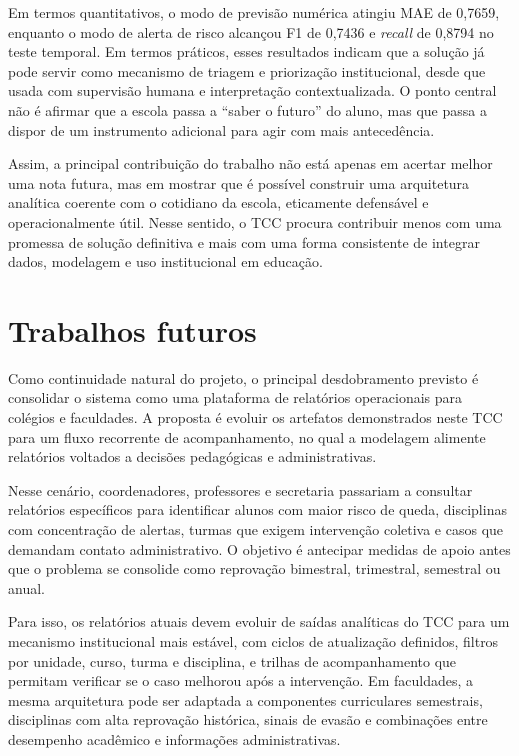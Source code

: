 Em termos quantitativos, o modo de previs\~ao num\'erica atingiu MAE de 0,7659, enquanto o modo de alerta de risco alcan\c{c}ou F1 de 0,7436 e \textit{recall} de 0,8794 no teste temporal. Em termos pr\'aticos, esses resultados indicam que a solu\c{c}\~ao j\'a pode servir como mecanismo de triagem e prioriza\c{c}\~ao institucional, desde que usada com supervis\~ao humana e interpreta\c{c}\~ao contextualizada. O ponto central n\~ao \'e afirmar que a escola passa a ``saber o futuro'' do aluno, mas que passa a dispor de um instrumento adicional para agir com mais anteced\^encia.

Assim, a principal contribui\c{c}\~ao do trabalho n\~ao est\'a apenas em acertar melhor uma nota futura, mas em mostrar que \'e poss\'ivel construir uma arquitetura anal\'itica coerente com o cotidiano da escola, eticamente defens\'avel e operacionalmente \'util. Nesse sentido, o TCC procura contribuir menos com uma promessa de solu\c{c}\~ao definitiva e mais com uma forma consistente de integrar dados, modelagem e uso institucional em educa\c{c}\~ao.

\section{Trabalhos futuros}
\label{sec:futuro}

Como continuidade natural do projeto, o principal desdobramento previsto \'e consolidar o sistema como uma plataforma de relat\'orios operacionais para col\'egios e faculdades. A proposta \'e evoluir os artefatos demonstrados neste TCC para um fluxo recorrente de acompanhamento, no qual a modelagem alimente relat\'orios voltados a decis\~oes pedag\'ogicas e administrativas.

Nesse cen\'ario, coordenadores, professores e secretaria passariam a consultar relat\'orios espec\'ificos para identificar alunos com maior risco de queda, disciplinas com concentra\c{c}\~ao de alertas, turmas que exigem interven\c{c}\~ao coletiva e casos que demandam contato administrativo. O objetivo \'e antecipar medidas de apoio antes que o problema se consolide como reprova\c{c}\~ao bimestral, trimestral, semestral ou anual.

Para isso, os relat\'orios atuais devem evoluir de sa\'idas anal\'iticas do TCC para um mecanismo institucional mais est\'avel, com ciclos de atualiza\c{c}\~ao definidos, filtros por unidade, curso, turma e disciplina, e trilhas de acompanhamento que permitam verificar se o caso melhorou ap\'os a interven\c{c}\~ao. Em faculdades, a mesma arquitetura pode ser adaptada a componentes curriculares semestrais, disciplinas com alta reprova\c{c}\~ao hist\'orica, sinais de evas\~ao e combina\c{c}\~oes entre desempenho acad\^emico e informa\c{c}\~oes administrativas.

